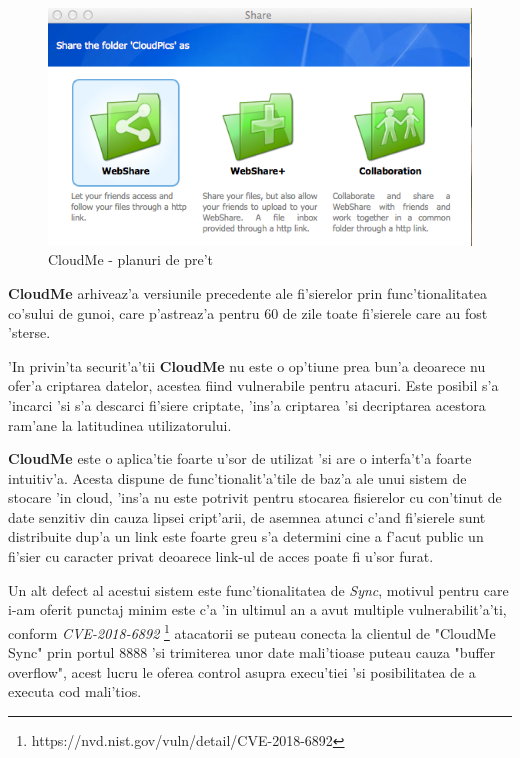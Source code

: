 \documentclass[12pt,a4paper,twoside]{report}
\begin{document}
\begin{figure}[H]
\begin{center}
\advance\leftskip-3cm
\advance\rightskip-3cm
\includegraphics[keepaspectratio=true,scale=0.3]{img/Share-options_CloudME.png}
\caption{CloudMe - planuri de pre't}
\label{share_cloudMe}
\end{center}
\end{figure}

\textbf{CloudMe} arhiveaz'a  versiunile precedente ale fi'sierelor  prin func'tionalitatea co'sului de gunoi, care p'astreaz'a pentru 60 de zile toate fi'sierele care au fost 'sterse.

'In privin'ta securit'a'tii \textbf{CloudMe} nu este o op'tiune prea bun'a deoarece nu ofer'a criptarea datelor, acestea fiind vulnerabile pentru atacuri. Este posibil s'a 'incarci 'si s'a descarci fi'siere criptate, 'ins'a criptarea 'si decriptarea acestora ram'ane la latitudinea utilizatorului.


\textbf{CloudMe} este o aplica'tie foarte u'sor de utilizat 'si are o interfa't'a foarte intuitiv'a. Acesta dispune de func'tionalit'a'tile de baz'a ale unui sistem de stocare 'in cloud, 'ins'a nu este potrivit pentru stocarea fisierelor cu con'tinut de date senzitiv din cauza lipsei cript'arii, de asemnea atunci c'and fi'sierele sunt distribuite dup'a un link este foarte greu s'a determini cine a f'acut public un fi'sier cu caracter privat deoarece link-ul de acces poate fi u'sor furat.

Un alt defect al acestui sistem este func'tionalitatea de {\it Sync}, motivul pentru care i-am oferit punctaj minim este c'a 'in ultimul an a avut multiple vulnerabilit'a'ti, conform {\it CVE-2018-6892} \footnote{https://nvd.nist.gov/vuln/detail/CVE-2018-6892} atacatorii se puteau conecta la clientul de  "CloudMe Sync" prin portul 8888 'si trimiterea unor date mali'tioase puteau cauza "buffer overflow", acest lucru le oferea control asupra execu'tiei 'si posibilitatea de a executa cod mali'tios.
\end{document}
